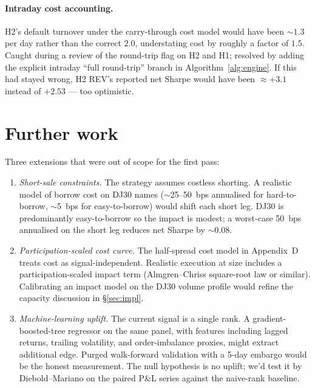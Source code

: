 \documentclass[10pt,conference,compsoc]{IEEEtran}
\begin{document}
\paragraph{Intraday cost accounting.} H2's default turnover under
the carry-through cost model would have been $\sim\!1.3$ per day
rather than the correct $2.0$, understating cost by roughly a
factor of $1.5$. Caught during a review of the round-trip flag
on H2 and H1; resolved by adding the explicit intraday
``full round-trip'' branch in Algorithm~\ref{alg:engine}. If
this had stayed wrong, H2 REV's reported net Sharpe would have
been $\approx +3.1$ instead of $+2.53$ --- too optimistic.

\section{Further work}
\label{app:further}

Three extensions that were out of scope for the first pass:

\begin{enumerate}[leftmargin=*]
  \item \emph{Short-sale constraints.} The strategy assumes costless
        shorting. A realistic model of borrow cost on DJ30 names
        ($\sim$25--50~bps annualised for hard-to-borrow, $\sim$5~bps
        for easy-to-borrow) would shift each short leg. DJ30 is
        predominantly easy-to-borrow so the impact is modest; a
        worst-case 50~bps annualised on the short leg reduces net
        Sharpe by $\sim 0.08$.
  \item \emph{Participation-scaled cost curve.} The half-spread
        cost model in Appendix~D treats cost as signal-independent.
        Realistic execution at size includes a participation-scaled
        impact term (Almgren--Chriss square-root law or similar).
        Calibrating an impact model on the DJ30 volume profile
        would refine the capacity discussion in \S\ref{sec:impl}.
  \item \emph{Machine-learning uplift.} The current signal is a
        single rank. A gradient-boosted-tree regressor on the
        same panel, with features including lagged returns,
        trailing volatility, and order-imbalance proxies, might
        extract additional edge. Purged walk-forward validation
        with a 5-day embargo would be the honest measurement. The
        null hypothesis is no uplift; we'd test it by Diebold--Mariano
        on the paired P\&L series against the naive-rank baseline.
\end{enumerate}
\end{document}
